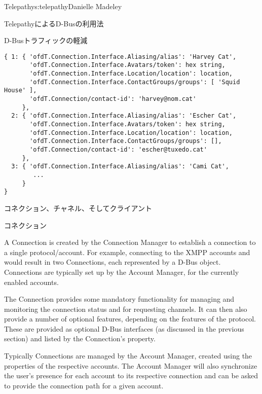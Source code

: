 \begin{aosachapter}{Telepathy}{s:telepathy}{Danielle Madeley}
\begin{aosasect1}{TelepathyによるD-Busの利用法}
\begin{aosasect2}{D-Busトラフィックの軽減}
\begin{verbatim}
{ 1: { 'ofdT.Connection.Interface.Aliasing/alias': 'Harvey Cat',
       'ofdT.Connection.Interface.Avatars/token': hex string,
       'ofdT.Connection.Interface.Location/location': location,
       'ofdT.Connection.Interface.ContactGroups/groups': [ 'Squid House' ],
       'ofdT.Connection/contact-id': 'harvey@nom.cat'
     },
  2: { 'ofdT.Connection.Interface.Aliasing/alias': 'Escher Cat',
       'ofdT.Connection.Interface.Avatars/token': hex string,
       'ofdT.Connection.Interface.Location/location': location,
       'ofdT.Connection.Interface.ContactGroups/groups': [],
       'ofdT.Connection/contact-id': 'escher@tuxedo.cat'
     },
  3: { 'ofdT.Connection.Interface.Aliasing/alias': 'Cami Cat',
        ...
     }
}
\end{verbatim}

\end{aosasect2}

\end{aosasect1}

\begin{aosasect1}{コネクション、チャネル、そしてクライアント}
\label{sec.telepathy.ccc}

\begin{aosasect2}{コネクション}

A Connection is created by the Connection Manager to establish a
connection to a single protocol/account. For example, connecting to
the XMPP accounts  and 
would result in two Connections, each represented by a D-Bus
object. Connections are typically set up by the Account Manager, for
the currently enabled accounts.

The Connection provides some mandatory functionality for managing and
monitoring the connection status and for requesting channels. It can
then also provide a number of optional features, depending on the
features of the protocol. These are provided as optional D-Bus
interfaces (as discussed in the previous section) and listed by the
Connection's  property.

Typically Connections are managed by the Account Manager, created
using the properties of the respective accounts. The Account Manager
will also synchronize the user's presence for each account to its
respective connection and can be asked to provide the connection path
for a given account.


\end{aosasect2}
\end{aosasect1}
\end{aosachapter}
